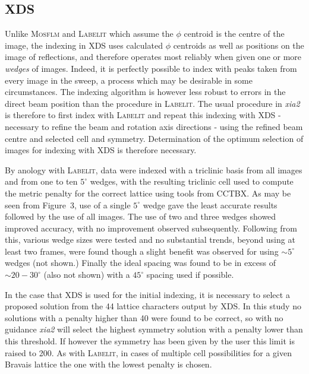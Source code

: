 \documentclass[preprint,pdf]{iucr}
\begin{document}
\subsection{XDS}

Unlike \textsc{Mosflm} and \textsc{Labelit} which assume the $\phi$ centroid is the
centre of the image, 
the indexing in XDS uses calculated $\phi$
centroids as well as positions on the image of reflections, and
therefore operates most reliably when given one or more \emph{wedges} of
images. Indeed, it is perfectly possible to index with peaks taken
from every image in the sweep, a process which may be desirable in some
circumstances. The indexing algorithm is however less robust to
errors in the direct beam position than the procedure in
\textsc{Labelit}. The usual procedure in \emph{xia2} is therefore to first
index with \textsc{Labelit} and repeat this indexing with XDS
 - necessary to refine the beam and rotation axis directions - 
using the refined beam centre and selected cell and symmetry. 
Determination of the optimum
selection of images for indexing with XDS is therefore necessary.

By anology with \textsc{Labelit}, data were indexed with a triclinic basis
from all images and from one to ten $5^{\circ}$ wedges, with the
resulting triclinic cell used to
compute the metric penalty for the correct lattice
using tools from CCTBX. As may be seen
from Figure~3,
use of a single $5^{\circ}$ wedge gave the least accurate
results followed by the use of all images. The use of two and three
wedges showed improved accuracy, with no improvement observed
subsequently. Following from this, various wedge sizes were tested and
no substantial trends, beyond using at least two frames, were found
though a slight benefit was observed for using $\sim 5^{\circ}$ wedges
(not shown.) Finally the ideal spacing was found to be 
in excess of $\sim 20 - 30^{\circ}$ (also not shown) with a
$45^{\circ}$ spacing used if possible.  

In the case that XDS is used for the initial indexing, it is necessary
to select a proposed solution from the 44 lattice characters output by
XDS. In this study no solutions with a penalty higher than 40 were
found to be correct, so with no guidance \emph{xia2} will select the
highest symmetry solution with a penalty lower than this threshold. If
however the symmetry has been given by the user this limit is raised
to 200. As with \textsc{Labelit}, in cases of multiple cell possibilities for a
given Bravais lattice the one with the lowest penalty is chosen.
\end{document}
